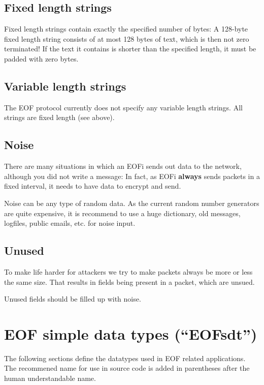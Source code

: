 \documentclass[12pt,a4paper]{book}
\begin{document}
\subsection{Fixed length strings}
Fixed length strings contain exactly the specified number of bytes:
A 128-byte fixed length string consists of at most 128 bytes of text,
which is then not zero terminated!
If the text it contains is shorter than the specified length,
it must be padded with zero bytes.
\subsection{Variable length strings}
The EOF protocol currently does not specify any variable length strings.
All strings are fixed length (see above).
\subsection{Noise}
There are many situations in which an EOFi sends out data to the network,
although you did not write a message: In fact, as EOFi \textbf{always}
sends packets in a fixed interval, it needs to have data to encrypt and send.

Noise can be any type of random data. As the current random number generators
are quite expensive, it is recommend to use a huge dictionary, old
messages, logfiles, public emails, etc. for noise input.
\subsection{Unused}
To make life harder for attackers we try to make packets always be more or
less the same size. That results in fields being present in a packet, which
are unsued.

Unused fields should be filled up with noise.
\section{EOF simple data types ("`EOFsdt"')}
The following sections define the datatypes used in EOF related
applications. The recommened name for use in source
code is added in parentheses after the human understandable name.
\end{document}

